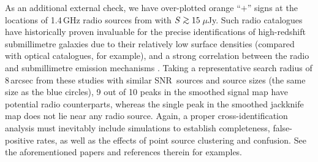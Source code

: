 \documentclass[useAMS,usenatbib,nofootinbib]{mn2e}
\newcommand{\snr}{SNR}
\def\gsim{\mathrel{\lower2.5pt\vbox{\lineskip=0pt\baselineskip=0pt
          \hbox{$>$}\hbox{$\sim$}}}}
\begin{document}
As an additional external check, we have over-plotted orange ``$+$''
signs at the locations of 1.4\,GHz radio sources from \citet{owen2008}
with $S\gsim15$\,$\mu$Jy. Such radio catalogues have historically
proven invaluable for the precise identifications of high-redshift
submillimetre galaxies due to their relatively low surface densities
(compared with optical catalogues, for example), and a strong
correlation between the radio and submillimetre emission mechanisms
\citep[e.g.,][]{smail2000,pope2006,ivison2007,chapin2009b}. Taking a
representative search radius of 8\,arcsec from these studies with
similar \snr\ sources and source sizes (the same size as the blue
circles), 9 out of 10 peaks in the smoothed signal map have potential
radio counterparts, whereas the single peak in the smoothed jackknife
map does not lie near any radio source. Again, a proper
cross-identification analysis must inevitably include simulations to
establish completeness, false-positive rates, as well as the effects
of point source clustering and confusion. See the aforementioned
papers and references therein for examples.
\end{document}
